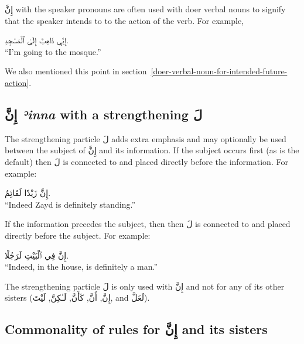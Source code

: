 \documentclass[
  10pt,
]{book}
\begin{document}
\foreignlanguage{arabic}{إِنَّ} with the speaker pronouns are often used with doer verbal nouns to signify that the speaker intends to to the action of the verb. For example,

\foreignlanguage{arabic}{إِنِّي ذَاهِبٌ إِلَىٰ ٱلْمَسْجِدِ.}\\
\enquote{I'm going to the mosque.}

We also mentioned this point in section~\ref{doer-verbal-noun-for-intended-future-action}.

\subsection{\texorpdfstring{\foreignlanguage{arabic}{إِنَّ} \emph{ʾinna} with a strengthening \foreignlanguage{arabic}{لَ}}{إِنَّ ʾinna with a strengthening لَ}}\label{inna-strengthening-la}

The strengthening particle \foreignlanguage{arabic}{لَ} adds extra emphasis and may optionally be used between the subject of \foreignlanguage{arabic}{إِنَّ} and its information.
If the subject occurs first (as is the default) then \foreignlanguage{arabic}{لَ} is connected to and placed directly before the information. For example:

\foreignlanguage{arabic}{إِنَّ زَيْدًا لَقَائِمٌ.}\\
\enquote{Indeed Zayd is definitely standing.}

If the information precedes the subject, then then \foreignlanguage{arabic}{لَ} is connected to and placed directly before the subject. For example:

\foreignlanguage{arabic}{إِنَّ فِي ٱلْبَيْتِ لَرَجُلًا.}\\
\enquote{Indeed, in the house, is definitely a man.}

The strengthening particle \foreignlanguage{arabic}{لَ} is only used with \foreignlanguage{arabic}{إِنَّ} and not for any of its other sisters
(\foreignlanguage{arabic}{إِنَّ},
\foreignlanguage{arabic}{أَنَّ},
\foreignlanguage{arabic}{کَأَنَّ},
\foreignlanguage{arabic}{لَـٰکِنَّ},
\foreignlanguage{arabic}{لَيْتَ}, and
\foreignlanguage{arabic}{لَعَلَّ}).

\subsection{\texorpdfstring{Commonality of rules for \foreignlanguage{arabic}{إِنَّ} and its sisters}{Commonality of rules for إِنَّ and its sisters}}\label{commonality-of-rules-for-ux625ux646-and-its-sisters}
\end{document}
